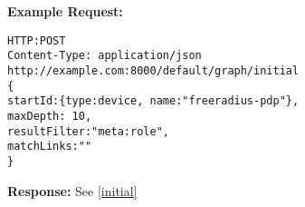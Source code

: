 \begin{minipage}{\linewidth}
\textbf{Example Request:}
\begin{lstlisting}
HTTP:POST
Content-Type: application/json
http://example.com:8000/default/graph/initial
{
startId:{type:device, name:"freeradius-pdp"},
maxDepth: 10,
resultFilter:"meta:role",
matchLinks:"" 
}
\end{lstlisting}
\end{minipage}

\begin{minipage}{\linewidth}
\textbf{Response:}
See \ref{initial}
\end{minipage}
